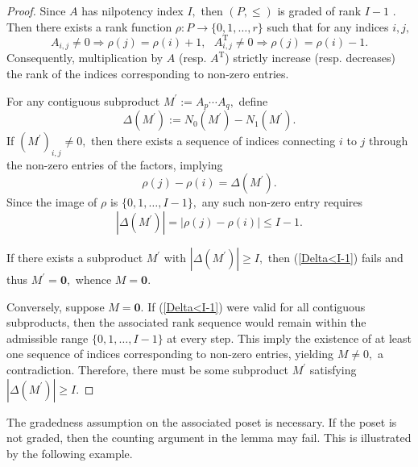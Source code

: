 \documentclass[reqno]{amsart}
\theoremstyle{plain}
\numberwithin{equation}{section}
\begin{document}
\begin{proof}
Since $A$ has nilpotency index $I,$ then $(P,\leq )$ is graded of rank $I-1$%
. Then there exists a rank function $\rho :P\longrightarrow \{0,1,\dots ,r\}$
such that for any indices $i,j,$ 
\begin{equation*}
A_{i,j}\neq 0\Longrightarrow \rho (j)=\rho (i)+1,\text{ }A_{i,j}^{\mathrm{T}%
}\neq 0\Longrightarrow \rho (j)=\rho (i)-1.
\end{equation*}%
Consequently, multiplication by $A$ (resp. $A^{\mathrm{T}}$) strictly
increase (resp. decreases) the rank of the indices corresponding to non-zero
entries.

For any contiguous subproduct $M^{\prime }:=A_{p}\cdots A_{q},$ define 
\begin{equation*}
\Delta (M^{\prime }):=N_{0}(M^{\prime })-N_{1}(M^{\prime }).
\end{equation*}%
If $(M^{\prime })_{i,j}\neq 0,$ then there exists a sequence of indices
connecting $i$ to $j$ through the non-zero entries of the factors, implying%
\begin{equation*}
\rho (j)-\rho (i)=\Delta (M^{\prime }).
\end{equation*}%
Since the image of $\rho $ is $\{0,1,\dots ,I-1\},$ any such non-zero entry
requires 
\begin{equation}
\left\vert \Delta (M^{\prime })\right\vert =\left\vert \rho (j)-\rho
(i)\right\vert \leq I-1.  \label{Delta<I-1}
\end{equation}

If there exists a subproduct $M^{\prime }$ with $\left\vert \Delta
(M^{\prime })\right\vert \geq I,$ then (\ref{Delta<I-1}) fails and thus $%
M^{\prime }=\boldsymbol{0},$ whence $M=\boldsymbol{0}$.

Conversely, suppose $M=\boldsymbol{0}$. If (\ref{Delta<I-1}) were valid for
all contiguous subproducts, then the associated rank sequence would remain
within the admissible range $\{0,1,\dots ,I-1\}$ at every step. This imply
the existence of at least one sequence of indices corresponding to non-zero
entries, yielding $M\neq 0,$ a contradiction. Therefore, there must be some
subproduct $M^{\prime }$ satisfying $\left\vert \Delta (M^{\prime
})\right\vert \geq I.$
\end{proof}

The gradedness assumption on the associated poset is necessary. If the poset
is not graded, then the counting argument in the lemma may fail. This is
illustrated by the following example.
\end{document}
